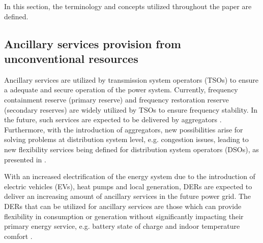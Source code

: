 In this section, the terminology and concepts utilized throughout the paper are defined. %

\subsection{Ancillary services provision from unconventional resources}\label{subsec:ASDER}
Ancillary services are utilized by transmission system operators (TSOs) to ensure a adequate and secure operation of the power system. 
Currently, frequency containment reserve (primary reserve) and frequency restoration reserve (secondary reserves) \cite{entso1operational} are widely utilized by TSOs to ensure frequency stability. In the future, such services are expected to be delivered by aggregators \cite{pudjianto2007virtual,vrettos2015integrating}. Furthermore, with the introduction of aggregators, new possibilities arise for solving problems at distribution system level, e.g. congestion issues, leading to new flexibility services being defined for distribution system operators (DSOs), as presented in \cite{ding2013development}. %

With an increased electrification of the energy system due to the introduction of electric vehicles (EVs), heat pumps and local generation, DERs are expected to deliver an increasing amount of ancillary services in the future power grid. The DERs that can be utilized for ancillary services are those which can provide flexibility in consumption or generation without significantly impacting their primary energy service, e.g. battery state of charge and indoor temperature comfort \cite{costanzo2013coordination,halvgaard2012economic}.

